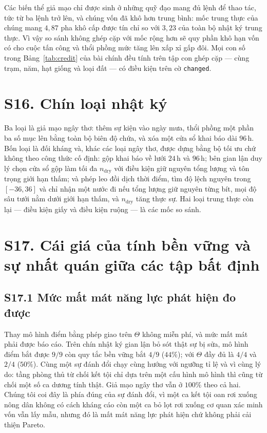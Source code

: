 Các biến thể giả mạo chỉ được sinh ở những quỹ đạo mang đủ lệnh để thao tác, tức từ ba lệnh
trở lên, và chúng vốn đã khô hơn trung bình: mốc trung thực của chúng mang $4{,}87$ pha khô
cấp được tín chỉ so với $3{,}23$ của toàn bộ nhật ký trung thực. Vì vậy so sánh không ghép cặp
với mốc rộng hơn sẽ quy phần khô hạn vốn có cho cuộc tấn công và thổi phồng mức tăng lên xấp xỉ
gấp đôi. Mọi con số trong Bảng~\ref{tab:credit} của bài chính đều tính trên tập con ghép cặp
--- cùng trạm, năm, hạt giống và loại đất --- có điều kiện trên cờ \texttt{changed}.

\section*{S16. Chín loại nhật ký}

Ba loại là giả mạo ngây thơ: thêm sự kiện vào ngày mưa, thổi phồng một phần ba số mục lên bằng
toàn bộ biên độ chứa, và xóa một cửa sổ khai báo dài $96$\,h. Bốn loại là đối kháng và, khác các
loại ngây thơ, được dựng bằng bộ tối ưu chứ không theo công thức cố định: gộp khai báo về lưới
$24$\,h và $96$\,h; bên gian lận duy lý chọn cửa sổ gộp làm tối đa $n_{\mathrm{dry}}$ với điều kiện
giữ nguyên tổng lượng và tôn trọng giới hạn thấm; và phép leo đồi dịch thời điểm, tìm độ lệch
nguyên trong $[-36,36]$ và chỉ nhận một nước đi nếu tổng lượng giữ nguyên từng bít, mọi độ sâu
tưới nằm dưới giới hạn thấm, và $n_{\mathrm{dry}}$ tăng thực sự. Hai loại trung thực còn lại --- điều
kiện giấy và điều kiện ruộng --- là các mốc so sánh.

\section*{S17. Cái giá của tính bền vững và sự nhất quán giữa các tập bất định}

\subsection*{S17.1 Mức mất mát năng lực phát hiện đo được}

Thay mô hình điểm bằng phép giao trên $\Theta$ không miễn phí, và mức mất mát phải được báo
cáo. Trên chín nhật ký gian lận bỏ sót thật sự bị sửa, mô hình điểm bắt được $9/9$ còn quy
tắc bền vững bắt $4/9$ ($44\%$); với $\Theta$ đầy đủ là $4/4$ và $2/4$ ($50\%$). Cùng một sự
đánh đổi chạy cùng hướng với ngưỡng tỉ lệ và vì cùng lý do: tầng phòng thủ từ chối kết tội
chỉ dựa trên một cấu hình mô hình thì cũng từ chối một số ca dương tính thật. Giả mạo ngây
thơ vẫn ở $100\%$ theo cả hai. Chúng tôi coi đây là phía đúng của sự đánh đổi, vì một ca kết
tội oan rơi xuống nông dân không có cách kháng cáo còn một ca bỏ lọt rơi xuống cơ quan xác
minh vốn vẫn lấy mẫu, nhưng đó là mất mát năng lực phát hiện chứ không phải cải thiện
Pareto.

